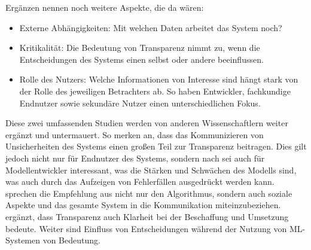 Ergänzen nennen \cite{vorm2018assessing} noch weitere Aspekte, die da wären:
\begin{itemize}
    \item Externe Abhängigkeiten: Mit welchen Daten arbeitet das System noch?
    \item Kritikalität: Die Bedeutung von Transparenz nimmt zu, wenn die Entscheidungen des Systems einen selbst oder andere beeinflussen.
    \item Rolle des Nutzers: Welche Informationen von Interesse sind hängt stark von der Rolle des jeweiligen Betrachters ab. So haben Entwickler, fachkundige Endnutzer sowie sekundäre Nutzer einen unterschiedlichen Fokus.
\end{itemize}

Diese zwei umfassenden Studien werden von anderen Wissenschaftlern weiter ergänzt und untermauert. So merken \cite{zhou20182d} an, dass das Kommunizieren von Unsicherheiten des Systems einen großen Teil zur Transparenz beitragen. Dies gilt jedoch nicht nur für Endnutzer des Systems, sondern nach \cite{gomez2021advice} sei auch für Modellentwickler interessant, was die Stärken und Schwächen des Modells sind, was auch durch das Aufzeigen von Fehlerfällen ausgedrückt werden kann.
\cite{irion2022algorithms} sprechen die Empfehlung aus nicht nur den Algorithmus, sondern auch soziale Aspekte und das gesamte System in die Kommunikation miteinzubeziehen.
\cite{goldenfein2019algorithmic} ergänzt, dass Transparenz auch Klarheit bei der Beschaffung und Umsetzung bedeute. Weiter sind Einfluss von Entscheidungen während der Nutzung von ML-Systemen von Bedeutung.